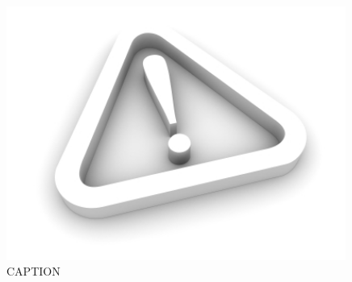 \begin{figure}[tb]
\begin{center}
\includegraphics[width=0.99\textwidth]{figs/empty.jpg}
\caption[SHORT TITLE]{CAPTION}
\label{fig:LABEL}
\end{center}
\end{figure}


